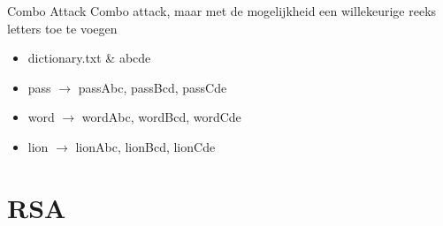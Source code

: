 \documentclass{beamer}
\begin{document}
\begin{frame}{Combo Attack}
Combo attack, maar met de mogelijkheid een willekeurige reeks letters toe te voegen
	\begin{itemize}
	\item dictionary.txt \& abcde
	\item pass $ \rightarrow $ passAbc, passBcd, passCde
	\item word $ \rightarrow $ wordAbc, wordBcd, wordCde
	\item lion $ \rightarrow $ lionAbc, lionBcd, lionCde
	\end{itemize}
\end{frame}

%	


\section{RSA}
\end{document}
